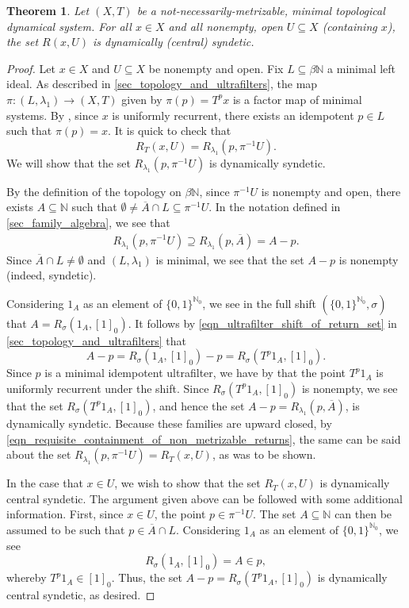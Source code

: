 \documentclass[letter,11pt]{article}
\theoremstyle{plain}
\newtheorem{theorem}{Theorem}
\theoremstyle{definition}
\theoremstyle{plain}
\theoremstyle{plain}
\numberwithin{equation}{section}
\newcommand{\N}{\mathbb{N}}
\begin{document}
\begin{theorem}
\label{lemma_metrizability_doesnt_matter}
Let $(X,T)$ be a not-necessarily-metrizable, minimal topological dynamical system.  For all $x \in X$ and all nonempty, open $U \subseteq X$ (containing $x$), the set $R(x,U)$ is dynamically (central) syndetic.
\end{theorem}

\begin{proof}
    Let $x \in X$ and $U \subseteq X$ be nonempty and open.  Fix $L \subseteq \beta \N$ a minimal left ideal.  As described in \cref{sec_topology_and_ultrafilters}, the map $\pi: (L, \lambda_1) \to (X,T)$ given by $\pi(p) = T^p x$ is a factor map of minimal systems.  By \cite[Thm. 19.23]{hindman_strauss_book_2012}, since $x$ is uniformly recurrent, there exists an idempotent $p \in L$ such that $\pi(p) = x$. It is quick to check that
    \[R_T(x, U) = R_{\lambda_1}(p, \pi^{-1} U).\]
    We will show that the set $R_{\lambda_1}(p, \pi^{-1} U)$ is dynamically syndetic.

    By the definition of the topology on $\beta \N$, since $\pi^{-1} U$ is nonempty and open, there exists $A \subseteq \N$ such that $\emptyset \neq \overline{A} \cap L \subseteq \pi^{-1} U$.  In the notation defined in \cref{sec_family_algebra}, we see that
    \begin{align}
    \label{eqn_requisite_containment_of_non_metrizable_returns}
        R_{\lambda_1}(p, \pi^{-1} U) \supseteq R_{\lambda_1}(p, \overline{A}) = A - p.
    \end{align}
    Since $\overline{A} \cap L \neq \emptyset$ and $(L,\lambda_1)$ is minimal, we see that the set $A-p$ is nonempty (indeed, syndetic).

    Considering $1_A$ as an element of $\{0,1\}^{\N_0}$, we see in the full shift $(\{0,1\}^{\N_0}, \sigma)$ that $A = R_{\sigma}(1_A,[1]_0)$.  It follows by \eqref{eqn_ultrafilter_shift_of_return_set} in \cref{sec_topology_and_ultrafilters} that
    \[A - p = R_{\sigma}(1_A,[1]_0) - p = R_{\sigma}(T^p 1_A, [1]_0).\]
    Since $p$ is a minimal idempotent ultrafilter, we have by \cite[Thm. 19.23]{hindman_strauss_book_2012} that the point $T^p 1_A$ is uniformly recurrent under the shift.  Since $R_{\sigma}(T^p 1_A, [1]_0)$ is nonempty, we see that the set $R_{\sigma}(T^p 1_A, [1]_0)$, and hence the set $A - p = R_{\lambda_1}(p, \overline{A})$, is dynamically syndetic.  Because these families are upward closed, by \eqref{eqn_requisite_containment_of_non_metrizable_returns}, the same can be said about the set $R_{\lambda_1}(p, \pi^{-1} U) = R_T(x, U)$, as was to be shown.

    In the case that $x \in U$, we wish to show that the set $R_T(x,U)$ is dynamically central syndetic.  The argument given above can be followed with some additional information.  First, since $x \in U$, the point $p \in \pi^{-1} U$.  The set $A \subseteq \N$ can then be assumed to be such that $p \in \overline{A} \cap L$. Considering $1_A$ as an element of $\{0,1\}^{\N_0}$, we see
    \[R_\sigma(1_A,[1]_0) = A \in p,\]
    whereby $T^p 1_A \in [1]_0$.  Thus, the set $A-p = R_{\sigma}(T^p 1_A, [1]_0)$ is dynamically central syndetic, as desired.
\end{proof}
\end{document}
